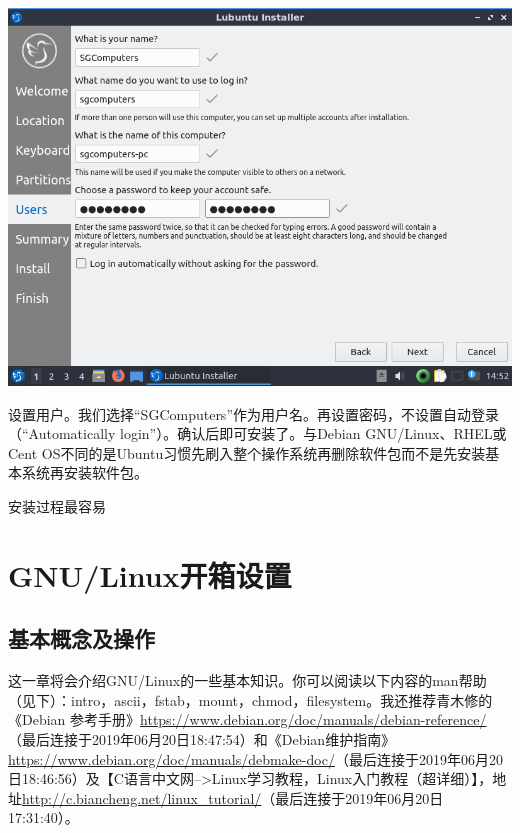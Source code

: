 \begin{center}
	\includegraphics[scale=0.6]{pic/lubinst12}
\end{center} \par
设置用户。我们选择“SGComputers”作为用户名。再设置密码，不设置自动登录（“Automatically login”）。确认后即可安装了。与Debian GNU/Linux、RHEL或Cent OS不同的是Ubuntu习惯先刷入整个操作系统再删除软件包而不是先安装基本系统再安装软件包。\par
安装过程最容易
\section{GNU/Linux开箱设置}
\subsection{基本概念及操作}
这一章将会介绍GNU/Linux的一些基本知识。你可以阅读以下内容的man帮助（见下）：intro，ascii，fstab，mount，chmod，filesystem。我还推荐青木修的《Debian 参考手册》\url{https://www.debian.org/doc/manuals/debian-reference/}（最后连接于2019年06月20日18:47:54）和《Debian维护指南》\url{https://www.debian.org/doc/manuals/debmake-doc/}（最后连接于2019年06月20日18:46:56）及【C语言中文网-->Linux学习教程，Linux入门教程（超详细）】，地址\url{http://c.biancheng.net/linux_tutorial/}（最后连接于2019年06月20日17:31:40）。\par
